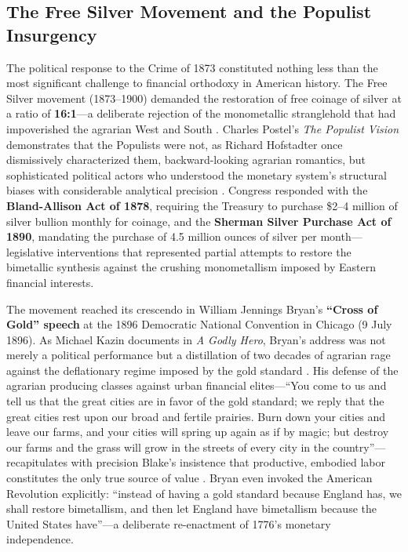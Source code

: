 \documentclass[
]{article}
\begin{document}
\subsection{The Free Silver Movement and the Populist
Insurgency}\label{the-free-silver-movement-and-the-populist-insurgency}

The political response to the Crime of 1873 constituted nothing less
than the most significant challenge to financial orthodoxy in American
history. The Free Silver movement (1873--1900) demanded the restoration
of free coinage of silver at a ratio of \textbf{16:1}---a deliberate
rejection of the monometallic stranglehold that had impoverished the
agrarian West and South \citep{laughlin1898bimetallism}. Charles
Postel's \emph{The Populist Vision} demonstrates that the Populists were
not, as Richard Hofstadter once dismissively characterized them,
backward-looking agrarian romantics, but sophisticated political actors
who understood the monetary system's structural biases with considerable
analytical precision \citep{postel2007populist, hofstadter1955age}.
Congress responded with the \textbf{Bland-Allison Act of 1878},
requiring the Treasury to purchase \$2--4 million of silver bullion
monthly for coinage, and the \textbf{Sherman Silver Purchase Act of
1890}, mandating the purchase of 4.5 million ounces of silver per
month---legislative interventions that represented partial attempts to
restore the bimetallic synthesis against the crushing monometallism
imposed by Eastern financial interests.

The movement reached its crescendo in William Jennings Bryan's
\textbf{``Cross of Gold'' speech} at the 1896 Democratic National
Convention in Chicago (9 July 1896). As Michael Kazin documents in
\emph{A Godly Hero}, Bryan's address was not merely a political
performance but a distillation of two decades of agrarian rage against
the deflationary regime imposed by the gold standard
\citep{kazin2006godly}. His defense of the agrarian producing classes
against urban financial elites---``You come to us and tell us that the
great cities are in favor of the gold standard; we reply that the great
cities rest upon our broad and fertile prairies. Burn down your cities
and leave our farms, and your cities will spring up again as if by
magic; but destroy our farms and the grass will grow in the streets of
every city in the country''---recapitulates with precision Blake's
insistence that productive, embodied labor constitutes the only true
source of value \citep{laughlin1898bimetallism}. Bryan even invoked the
American Revolution explicitly: ``instead of having a gold standard
because England has, we shall restore bimetallism, and then let England
have bimetallism because the United States have''---a deliberate
re-enactment of 1776's monetary independence.
\end{document}
